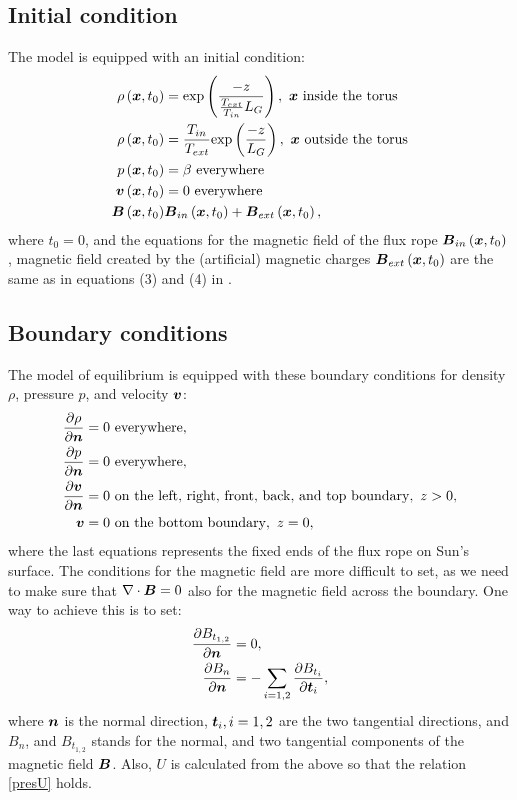 \subsection{Initial condition}
The model is equipped with an initial condition:
\begin{align}
\rho\left(\mbox{\boldmath $x$}, t_0\right) & = \mathrm{exp}\left(\frac{-z}{\frac{ T_{ext} }{T_{in}}L_G}\right),\ \mbox{\boldmath $x$}\ \text{inside the torus}\\
\rho\left(\mbox{\boldmath $x$}, t_0\right) & = \frac{ T_{in} }{T_{ext}} \mathrm{exp}\left(\frac{-z}{L_G}\right),\ \mbox{\boldmath $x$}\ \text{outside the torus}\\
p\left(\mbox{\boldmath $x$}, t_0\right) & = \beta\ \text{everywhere}\\
\mbox{\boldmath $v$}\left(\mbox{\boldmath $x$}, t_0\right) & = 0\ \text{everywhere}\\
\mbox{\boldmath $B$}\left(\mbox{\boldmath $x$}, t_0\right) & \mbox{\boldmath $B$}_{in}\left(\mbox{\boldmath $x$}, t_0\right) + \mbox{\boldmath $B$}_{ext}\left(\mbox{\boldmath $x$}, t_0\right),
\end{align}
where $t_0 = 0$, and the equations for the magnetic field of the flux rope $\mbox{\boldmath $B$}_{in}\left(\mbox{\boldmath $x$}, t_0\right)$, magnetic field created by the (artificial) magnetic charges $\mbox{\boldmath $B$}_{ext}\left(\mbox{\boldmath $x$}, t_0\right)$ are the same as in equations (3) and (4) in \cite{miraClanek}.
\subsection{Boundary conditions}
The model of equilibrium is equipped with these boundary conditions for density $\rho$, pressure $p$, and velocity $\mbox{\boldmath $v$}$:
\begin{align}
\frac{\partial \rho}{\partial \mbox{\boldmath $n$}} & = 0\ \text{everywhere},\\
\frac{\partial p}{\partial \mbox{\boldmath $n$}} & = 0\ \text{everywhere},\\
\frac{\partial \mbox{\boldmath $v$}}{\partial \mbox{\boldmath $n$}} & = 0\ \text{on the left, right, front, back, and top boundary},\ z > 0,\\
\mbox{\boldmath $v$} & = 0\ \text{on the bottom boundary},\ z = 0,\\
\end{align}
where the last equations represents the fixed ends of the flux rope on Sun's surface.
The conditions for the magnetic field are more difficult to set, as we need to make sure that $\nabla \cdot \mbox{\boldmath $B$} = 0$ also for the magnetic field across the boundary.
One way to achieve this is to set:
\begin{align}
\frac{\partial B_{t_{1,2}}}{\partial \mbox{\boldmath $n$}} & = 0,\\
\frac{\partial B_n}{\partial \mbox{\boldmath $n$}} & = -\sum_{i = 1, 2}\frac{\partial B_{t_{i}}}{\partial \mbox{\boldmath $t$}_{i}},
\end{align}
where $\mbox{\boldmath $n$}$ is the normal direction, $\mbox{\boldmath $t$}_{i}, i = 1, 2$ are the two tangential directions, and $B_n$, and $B_{t_{1,2}}$ stands for the normal, and two tangential components of the magnetic field $\mbox{\boldmath $B$}$. Also, $U$ is calculated from the above so that the relation \cref{presU} holds.

